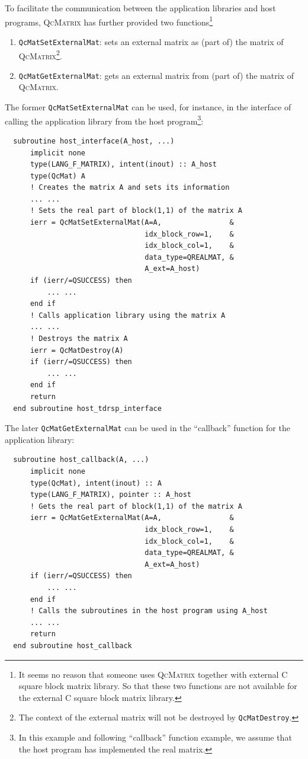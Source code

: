\documentclass[a4paper,11pt,twoside,openright]{book}
\begin{document}
To facilitate the communication between the application libraries and host programs,
\textsc{QcMatrix} has further provided two functions\footnote{It seems no reason that
someone uses \textsc{QcMatrix} together with external C square block matrix library.
So that these two functions are not available for the external C square block
matrix library.}
\begin{enumerate}
  \item \verb|QcMatSetExternalMat|:
    sets an external matrix as (part of) the matrix of \textsc{QcMatrix}\footnote{The
    context of the external matrix will not be destroyed by \texttt{QcMatDestroy}.}.
  \item \verb|QcMatGetExternalMat|:
    gets an external matrix from (part of) the matrix of \textsc{QcMatrix}.
\end{enumerate}
The former \verb|QcMatSetExternalMat| can be used, for instance, in the interface of
calling the application library from the host program\footnote{In this example and
following ``callback'' function example, we assume that the host program has implemented
the real matrix.}:
\begin{verbatim}
  subroutine host_interface(A_host, ...)
      implicit none
      type(LANG_F_MATRIX), intent(inout) :: A_host
      type(QcMat) A
      ! Creates the matrix A and sets its information
      ... ...
      ! Sets the real part of block(1,1) of the matrix A
      ierr = QcMatSetExternalMat(A=A,                &
                                 idx_block_row=1,    &
                                 idx_block_col=1,    &
                                 data_type=QREALMAT, &
                                 A_ext=A_host)
      if (ierr/=QSUCCESS) then
          ... ...
      end if
      ! Calls application library using the matrix A
      ... ...
      ! Destroys the matrix A
      ierr = QcMatDestroy(A)
      if (ierr/=QSUCCESS) then
          ... ...
      end if
      return
  end subroutine host_tdrsp_interface
\end{verbatim}

The later \verb|QcMatGetExternalMat| can be used in the ``callback'' function
for the application library:
\begin{verbatim}
  subroutine host_callback(A, ...)
      implicit none
      type(QcMat), intent(inout) :: A
      type(LANG_F_MATRIX), pointer :: A_host
      ! Gets the real part of block(1,1) of the matrix A
      ierr = QcMatGetExternalMat(A=A,                &
                                 idx_block_row=1,    &
                                 idx_block_col=1,    &
                                 data_type=QREALMAT, &
                                 A_ext=A_host)
      if (ierr/=QSUCCESS) then
          ... ...
      end if
      ! Calls the subroutines in the host program using A_host
      ... ...
      return
  end subroutine host_callback
\end{verbatim}
\end{document}
